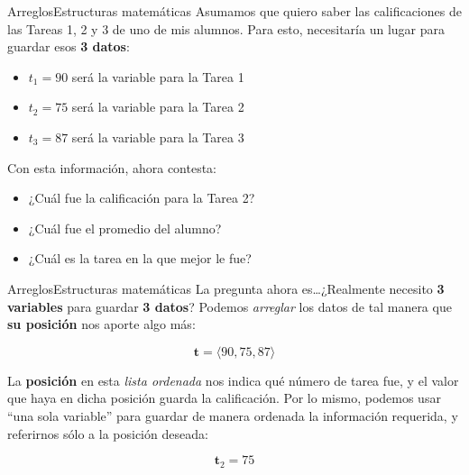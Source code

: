 \documentclass[spanish, c]{beamer}
\begin{document}
\begin{frame}{Arreglos}{Estructuras matemáticas}
    Asumamos que quiero saber las calificaciones de las Tareas 1, 2 y 3 de uno de mis alumnos.
    Para esto, necesitaría un lugar para guardar esos \textbf{3 datos}: \pause

    \bigskip

    \begin{itemize}[<+->]
        \item $t_1 = 90$ será la variable para la Tarea 1
        \item $t_2 = 75$ será la variable para la Tarea 2
        \item $t_3 = 87$ será la variable para la Tarea 3
    \end{itemize}

    \bigskip

    Con esta información, ahora contesta:

    \begin{itemize}[<+->]
        \item ¿Cuál fue la calificación para la Tarea 2?
        \item ¿Cuál fue el promedio del alumno?
        \item ¿Cuál es la tarea en la que mejor le fue?
    \end{itemize}
\end{frame}

\begin{frame}{Arreglos}{Estructuras matemáticas}
    La pregunta ahora es\dots ¿Realmente necesito \textbf{3 variables} para guardar \textbf{3 datos}?
    Podemos \textit{arreglar} los datos de tal manera que \textbf{su posición} nos aporte algo más: \pause

    $$\mathbf{t} = \langle 90, 75, 87 \rangle$$ \pause

    La \textbf{posición} en esta \textit{lista ordenada} nos indica qué número de tarea fue, y el valor que haya en dicha posición guarda la calificación. Por lo mismo, podemos usar ``una sola variable'' para guardar de manera ordenada la información requerida, y referirnos sólo a la posición deseada:

    $$\mathbf{t}_2 = 75$$
\end{frame}
\end{document}
